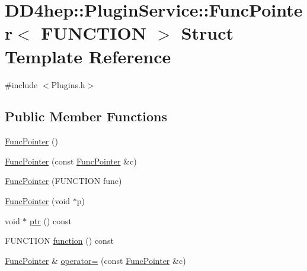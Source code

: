 \hypertarget{struct_d_d4hep_1_1_plugin_service_1_1_func_pointer}{}\section{D\+D4hep\+:\+:Plugin\+Service\+:\+:Func\+Pointer$<$ F\+U\+N\+C\+T\+I\+ON $>$ Struct Template Reference}
\label{struct_d_d4hep_1_1_plugin_service_1_1_func_pointer}


{\ttfamily \#include $<$Plugins.\+h$>$}

\subsection*{Public Member Functions}
\begin{DoxyCompactItemize}
\item 
\hyperlink{struct_d_d4hep_1_1_plugin_service_1_1_func_pointer_ae5956ad0aad6406a1e9f8132ec730814}{Func\+Pointer} ()
\item 
\hyperlink{struct_d_d4hep_1_1_plugin_service_1_1_func_pointer_ae44e78b875229c095bbb81a40ddd2a30}{Func\+Pointer} (const \hyperlink{struct_d_d4hep_1_1_plugin_service_1_1_func_pointer}{Func\+Pointer} \&c)
\item 
\hyperlink{struct_d_d4hep_1_1_plugin_service_1_1_func_pointer_ae945b6d39759becb51d6d37dd05eed6e}{Func\+Pointer} (F\+U\+N\+C\+T\+I\+ON func)
\item 
\hyperlink{struct_d_d4hep_1_1_plugin_service_1_1_func_pointer_a42c98ba137676de62b6da889eeff5421}{Func\+Pointer} (void $\ast$p)
\item 
void $\ast$ \hyperlink{struct_d_d4hep_1_1_plugin_service_1_1_func_pointer_ad6d585ac1955a3d6671ae0f158f76266}{ptr} () const
\item 
F\+U\+N\+C\+T\+I\+ON \hyperlink{struct_d_d4hep_1_1_plugin_service_1_1_func_pointer_a9599711ab2c08dc892796fa01c48765a}{function} () const
\item 
\hyperlink{struct_d_d4hep_1_1_plugin_service_1_1_func_pointer}{Func\+Pointer} \& \hyperlink{struct_d_d4hep_1_1_plugin_service_1_1_func_pointer_a90ba8c1510a405a5cf21da4625c9e76b}{operator=} (const \hyperlink{struct_d_d4hep_1_1_plugin_service_1_1_func_pointer}{Func\+Pointer} \&c)
\end{DoxyCompactItemize}
